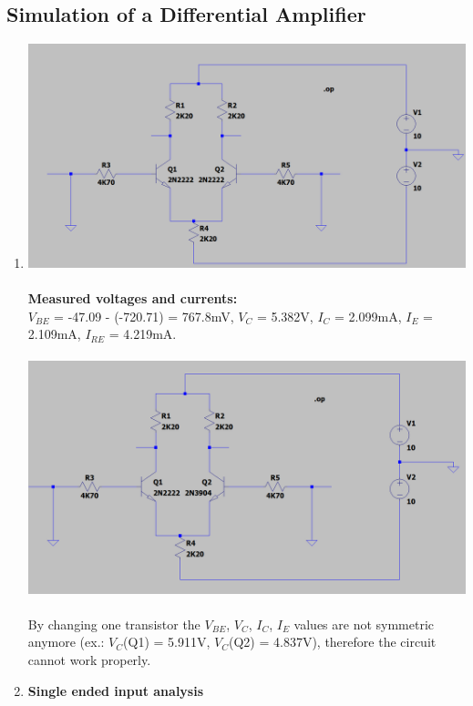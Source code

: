 \documentclass{article}
\begin{document}
	\subsection{Simulation of a Differential Amplifier}
		\begin{enumerate}
			\item \includegraphics[scale=0.4]{circuit 1 - no input}\\\\
			\textbf{Measured voltages and currents:}\\
			\(V_{BE}\) = -47.09 - (-720.71) = 767.8mV,  \(V_C\) = 5.382V, \(I_C\) = 2.099mA, \(I_E\) = 2.109mA, \(I_{RE}\) = 4.219mA.\\\\
			\includegraphics[scale=0.4]{circuit 1 - tr changed}\\\\
			By changing one transistor the \(V_{BE}\), \(V_C\), \(I_C\), \(I_E\) values are not symmetric anymore (ex.: \(V_C\)(Q1) = 5.911V, \(V_C\)(Q2) = 4.837V), therefore the circuit cannot work properly.
			\item \textbf{Single ended input analysis}\\\\

\end{enumerate}
\end{document}

